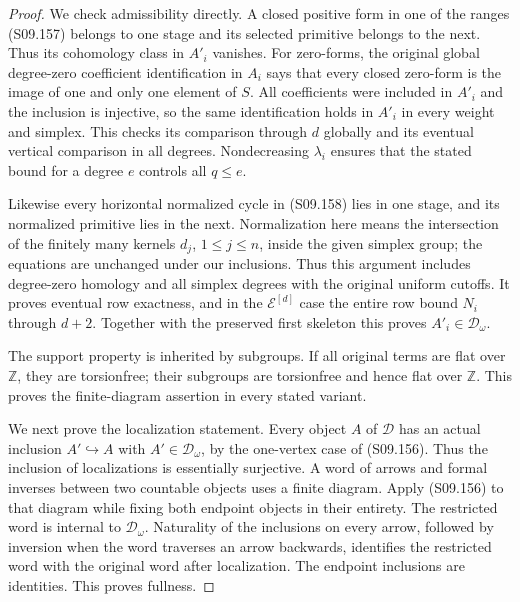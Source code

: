\begin{proof}
We check admissibility directly. A closed positive form in one
of the ranges (S09.157) belongs to one stage and its selected
primitive belongs to the next. Thus its cohomology class in
$A'_i$ vanishes. For zero-forms, the original global degree-zero
coefficient identification in $A_i$ says that every closed
zero-form is the image of one and only one element of $S$.
All coefficients were included in $A'_i$ and the inclusion is
injective, so the same identification holds in $A'_i$ in every
weight and simplex. This checks its comparison through $d$
globally and its eventual vertical comparison in all degrees.
Nondecreasing $\lambda_i$ ensures that the stated bound for a
degree $e$ controls all $q\leq e$.

Likewise every horizontal normalized cycle in (S09.158) lies
in one stage, and its normalized primitive lies in the next.
Normalization here means the intersection of the finitely many
kernels $d_j$, $1\leq j\leq n$, inside the given simplex group;
the equations are unchanged under our inclusions. Thus this
argument includes degree-zero homology and all simplex degrees
with the original uniform cutoffs. It proves eventual row
exactness, and in the $\mathcal E^{[d]}$ case the entire row
bound $N_i$ through $d+2$. Together with the preserved first
skeleton this proves $A'_i\in\mathcal D_\omega$.

The support property is inherited by subgroups. If all original
terms are flat over $\mathbb Z$, they are torsionfree; their
subgroups are torsionfree and hence flat over $\mathbb Z$.
This proves the finite-diagram assertion in every stated variant.

We next prove the localization statement. Every object $A$ of
$\mathcal D$ has an actual inclusion $A'\hookrightarrow A$
with $A'\in\mathcal D_\omega$, by the one-vertex case of
(S09.156). Thus the inclusion of localizations is essentially
surjective. A word of arrows and formal inverses between two
countable objects uses a finite diagram. Apply (S09.156) to that
diagram while fixing both endpoint objects in their entirety.
The restricted word is internal to $\mathcal D_\omega$.
Naturality of the inclusions on every arrow, followed by
inversion when the word traverses an arrow backwards, identifies
the restricted word with the original word after localization.
The endpoint inclusions are identities. This proves fullness.


\end{proof}
